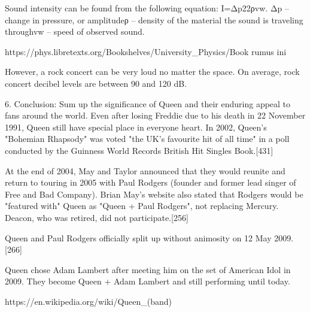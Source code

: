 \documentclass[a4j, twocolumn]{jarticle}
\begin{document}
Sound intensity can be found from the following equation: I=Δp22ρvw. Δp – change in pressure, or amplitudeρ – density of the material the sound is traveling throughvw – speed of observed sound.

https://phys.libretexts.org/Bookshelves/University_Physics/Book%
rumus ini

However, a rock concert can be very loud no matter the space. On average, rock concert decibel levels are between 90 and 120 dB. 


6. Conclusion: Sum up the significance of Queen and their enduring appeal to fans around the world.
Even after losing Freddie due to his death in 22 November 1991, Queen still have special place in everyone heart.
In 2002, Queen's "Bohemian Rhapsody" was voted "the UK's favourite hit of all time" in a poll conducted by the Guinness World Records British Hit Singles Book.[431]

At the end of 2004, May and Taylor announced that they would reunite and return to touring in 2005 with Paul Rodgers (founder and former lead singer of Free and Bad Company). Brian May's website also stated that Rodgers would be "featured with" Queen as "Queen + Paul Rodgers", not replacing Mercury. Deacon, who was retired, did not participate.[256]

Queen and Paul Rodgers officially split up without animosity on 12 May 2009.[266]

Queen chose Adam Lambert after meeting him on the set of American Idol in 2009. They become Queen + Adam Lambert and still performing until today.

https://en.wikipedia.org/wiki/Queen_(band)
\end{document}
